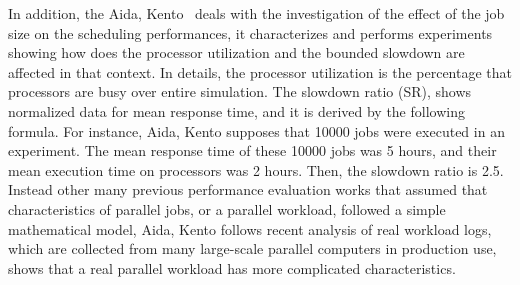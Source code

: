 In addition, the Aida, Kento~\cite{job_size} deals with the investigation of the effect of the job size on the scheduling performances, it characterizes and performs experiments showing how does the processor utilization and the bounded slowdown are affected in that context. In details, the processor utilization is the percentage that processors are busy over entire simulation. The slowdown ratio (SR), shows normalized data for mean response time, and it is derived by the following formula. For instance, Aida, Kento supposes that 10000 jobs were executed in an experiment. The mean response time of these 10000 jobs was 5 hours, and their mean execution time on processors was 2 hours. Then, the slowdown ratio is 2.5.
Instead other many previous performance evaluation works that assumed that characteristics of parallel jobs, or a parallel workload, followed a simple mathematical model, Aida, Kento follows recent analysis of real workload logs, which are collected from many large-scale parallel computers in production use, shows that a real parallel workload has more complicated characteristics.%

